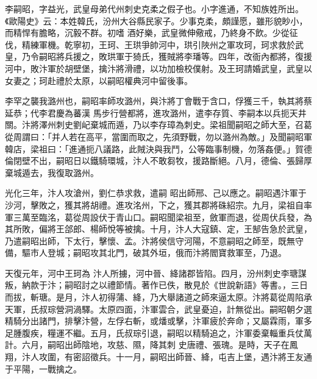 
\begin{pinyinscope}

 李嗣昭，字益光，武皇母弟代州刺史克柔之假子也。小字進通，不知族姓所出。《歐陽史》云：本姓韓氏，汾州大谷縣民家子。少事克柔，頗謹愿，雖形貌眇小，而精悍有膽略，沉毅不群。初嗜
 酒好樂，武皇微伸儆戒，乃終身不飲。少從征伐，精練軍機。乾寧初，王珂、王珙爭帥河中，珙引陜州之軍攻珂，珂求救於武皇，乃令嗣昭將兵援之，敗珙軍于猗氏，獲賊將李璠等。四年，改衙內都將，復援河中，敗汴軍於胡壁堡，擒汴將滑禮，以功加檢校僕射。及王珂請婚武皇，武皇以女妻之；珂赴禮於太原，以嗣昭權典河中留後事。



 李罕之襲我潞州也，嗣昭率師攻潞州，與汴將丁會戰于含口，俘獲三千，執其將蔡延恭；代李君慶為蕃漢
 馬步行營都將，進攻潞州，遣李存質、李嗣本以兵扼天井關。汴將澤州刺史劉屺棄城而遁，乃以李存璋為刺史。梁祖聞嗣昭之師大至，召葛從周謂曰：「并人若在高平，當圍而取之，先須野戰，勿以潞州為敵。」及聞嗣昭軍韓店，梁祖曰：「進通扼八議路，此賊決與我鬥，公等臨事制機，勿落姦便。」賀德倫閉壁不出，嗣昭日以鐵騎環城，汴人不敢芻牧，援路斷絕。八月，德倫、張歸厚棄城遁去，我復取潞州。



 光化三年，汴人攻滄州，劉仁恭求救，遣嗣
 昭出師邢、己以應之。嗣昭遇汴軍于沙河，擊敗之，獲其將胡禮。進攻洺州，下之，獲其郡將硃紹宗。九月，梁祖自率軍三萬至臨洺，葛從周設伏于青山口。嗣昭聞梁祖至，斂軍而退，從周伏兵發，為其所敗，偏將王郃郎、楊師悅等被擒。十月，汴人大寇鎮、定，王郜告急於武皇，乃遣嗣昭出師，下太行，擊懷、孟。汴將侯信守河陽，不意嗣昭之師至，既無守備，驅市人登城；嗣昭攻其北門，破其外垣，俄而汴將閻寶救軍至，乃退。



 天復元年，河中王珂為
 汴人所擄，河中晉、絳諸郡皆陷。四月，汾州刺史李瑭謀叛，納款于汴；嗣昭討之以禮節情。著作已佚，散見於《世說新語》等書。，三日而拔，斬瑭。是月，汴人初得蒲、絳，乃大舉諸道之師來逼太原。汴將葛從周陷承天軍，氏叔琮營洞渦驛。太原四面，汴軍雲合，武皇憂迫，計無從出。嗣昭朝夕選精騎分出諸門，排擊汴營，左俘右斬，或燔或擊，汴軍疲於奔命；又屬霖雨，軍多足腫腹疾，糧運不繼。五月，氏叔琮引退，嗣昭以精騎追之，汴軍委棄輜重兵仗萬計。六月，嗣昭出師陰地，攻慈、隰，降其刺
 史唐禮、張瑰。是時，天子在鳳翔，汴人攻圍，有密詔徵兵。十一月，嗣昭出師晉、絳，屯吉上堡，遇汴將王友通于平陽，一戰擒之。




\end{pinyinscope}
